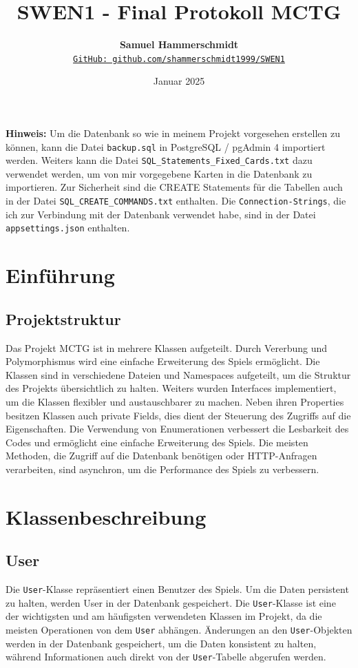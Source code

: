 \documentclass[a4paper, 12pt]{article}
\title{\vspace{-1cm}SWEN1 - Final Protokoll MCTG}
\author{
    \textbf{Samuel Hammerschmidt} \\
    \href{https://github.com/shammerschmidt1999/SWEN1}{\texttt{GitHub: github.com/shammerschmidt1999/SWEN1}}
}
\date{Januar 2025}
\begin{document}
\maketitle

\noindent\textbf{Hinweis:} Um die Datenbank so wie in meinem Projekt vorgesehen erstellen zu können, kann die Datei \texttt{backup.sql} in PostgreSQL / pgAdmin 4 importiert werden.
Weiters kann die Datei \texttt{SQL\_Statements\_Fixed\_Cards.txt} dazu verwendet werden, um von mir vorgegebene Karten in die Datenbank zu importieren.
Zur Sicherheit sind die CREATE Statements für die Tabellen auch in der Datei \texttt{SQL\_CREATE\_COMMANDS.txt} enthalten.
Die \texttt{Connection-Strings}, die ich zur Verbindung mit der Datenbank verwendet habe, sind in der Datei \texttt{appsettings.json} enthalten.


\section{Einführung}
\subsection{Projektstruktur}
Das Projekt MCTG ist in mehrere Klassen aufgeteilt. Durch Vererbung und Polymorphismus wird eine einfache Erweiterung des Spiels ermöglicht.
Die Klassen sind in verschiedene Dateien und Namespaces aufgeteilt, um die Struktur des Projekts übersichtlich zu halten. 
Weiters wurden Interfaces implementiert, um die Klassen flexibler und austauschbarer zu machen.
Neben ihren Properties besitzen Klassen auch private Fields, dies dient der Steuerung des Zugriffs auf die Eigenschaften.
Die Verwendung von Enumerationen verbessert die Lesbarkeit des Codes und ermöglicht eine einfache Erweiterung des Spiels.
Die meisten Methoden, die Zugriff auf die Datenbank benötigen oder HTTP-Anfragen verarbeiten, sind asynchron, um die Performance des Spiels zu verbessern.

\vspace{0.5cm}
\section{Klassenbeschreibung}
\subsection{User}
Die \texttt{User}-Klasse repräsentiert einen Benutzer des Spiels. Um die Daten persistent zu halten, werden User in der Datenbank gespeichert.
Die \texttt{User}-Klasse ist eine der wichtigsten und am häufigsten verwendeten Klassen im Projekt, da die meisten Operationen von dem \texttt{User} abhängen.
Änderungen an den \texttt{User}-Objekten werden in der Datenbank gespeichert, um die Daten konsistent zu halten, während Informationen auch direkt von der \texttt{User}-Tabelle abgerufen werden.
\end{document}
